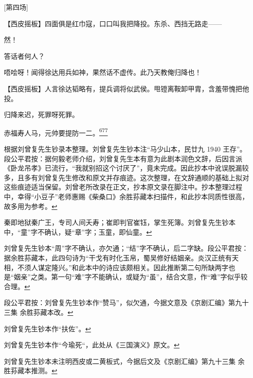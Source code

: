 {[}第四场{]}

【西皮摇板】四面俱是红巾寇，口口叫我把降投。东杀、西挡无路走------

然！

答话者何人？

唔哙呀！闻得徐达用兵如神，果然话不虚传。此乃天教俺归降也！

【西皮摇板】人言徐达韬略有，提兵调将似武侯。甩镫离鞍卸甲胄，含羞带愧把他投。

归降来迟，死罪呀死罪。

赤福寿人马，元帅要提防一二。\protect\hyperlink{fn677}{\textsuperscript{677}}

\item
  \leavevmode\hypertarget{fn636}{}%
  根据刘曾复先生钞录本整理。刘曾复先生钞本注``马少山本，民廿九 1940
  王存''。段公平君按：据何毅老师介绍，刘曾复先生本有意为此剧本润色文辞，后因言派《卧龙吊孝》已流行，``我就别招这个讨厌了''，竟未完成。因此抄本中讹误脱漏较多，且多有刘曾复先生修改和原文并存痕迹。这次整理，在文辞通顺的基础上拟对这些痕迹适当保留。刘曾老所改录在正文，抄本原文录在脚注中。抄本整理过程中，幸得``小豆子''老师惠赐《柴桑口》余胜荪藏本扫描件，和此抄本同质性很高，故多用为参考。\protect\hyperlink{fnref636}{↩}
\item
  \leavevmode\hypertarget{fn637}{}%
  秦即地狱秦广王，专司人间夭寿；崔即判官崔钰，掌生死簿。刘曾复先生钞本中，``童''字不确认，疑``章''字；玉童，即仙童。\protect\hyperlink{fnref637}{↩}
\item
  \leavevmode\hypertarget{fn638}{}%
  刘曾复先生钞本``周''字不确认，亦欠通；``结''字不确认，后二字缺。段公平君按：据余胜荪藏本，此四句诗为``干戈有时化玉帛，蜀吴修好结姻亲。炎汉正统有天相，不须人谋定隆兴。''和此本中的诗应该颇相关。因此推断第二句所缺两字也是``姻亲''之类。第一句``难''字不能确认，或疑为``虽''，结合文意，作``难''字似乎较合理。\protect\hyperlink{fnref638}{↩}
\item
  \leavevmode\hypertarget{fn639}{}%
  段公平君按：刘曾复先生钞本作``赞马''，似欠通，今据文意及《京剧汇编》第九十三集
  余胜荪藏本改。\protect\hyperlink{fnref639}{↩}
\item
  \leavevmode\hypertarget{fn640}{}%
  刘曾复先生钞本作``扶佐''。\protect\hyperlink{fnref640}{↩}
\item
  \leavevmode\hypertarget{fn641}{}%
  刘曾复先生钞本作``今瑜死``，此处从《三国演义》原文。\protect\hyperlink{fnref641}{↩}
\item
  \leavevmode\hypertarget{fn642}{}%
  刘曾复先生钞本未注明西皮或二黄板式，今据后文及《京剧汇编》第九十三集
  余胜荪藏本推测。\protect\hyperlink{fnref642}{↩}
